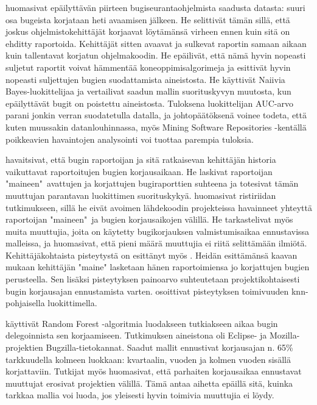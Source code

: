 \documentclass[utf8]{gradu3}
\begin{document}
\textcite{Lamkanfi-2012} huomasivat epäilyttävän piirteen bugiseurantaohjelmista
saadusta datasta: suuri osa bugeista korjataan heti avaamisen jälkeen. He
selittivät tämän sillä, että joskus ohjelmistokehittäjät korjaavat löytämänsä
virheen ennen kuin sitä on ehditty raportoida. Kehittäjät sitten avaavat ja
sulkevat raportin samaan aikaan kuin tallentavat korjatun ohjelmakoodin. He
epäilivät, että nämä hyvin nopeasti suljetut raportit voivat hämmentää
koneoppimisalgorimeja ja esittivät hyvin nopeasti suljettujen bugien
suodattamista aineistosta. %
He käyttivät Naiivia Bayes-luokittelijaa ja vertailivat saadun mallin
suorituskyvyn muutosta, kun epäilyttävät bugit on poistettu aineistosta.
Tuloksena luokittelijan AUC-arvo parani jonkin verran suodatetulla datalla, ja
johtopäätöksenä voinee todeta, että kuten muussakin datanlouhinnassa, myös
Mining Software Repositories -kentällä poikkeavien havaintojen analysointi voi
tuottaa parempia tuloksia.
 

\textcite{Guo-2010} havaitsivat, että bugin raportoijan ja sitä ratkaisevan
kehittäjän  historia vaikuttavat raportoitujen bugien korjausaikaan. He laskivat
raportoijan "maineen"\ avattujen ja korjattujen bugiraporttien suhteena ja
totesivat tämän muuttujan parantavan luokittimen suorituskykyä.%
\textcite{Bhattacharya-2011} huomasivat ristiriidan \parencite{Guo-2010}
tutkimukseen, sillä he eivät avoimen lähdekoodin projekteissa havainneet
yhteyttä raportoijan "maineen"\ ja bugien korjausaikojen välillä. He
tarkastelivat myös muita muuttujia, joita on käytetty bugikorjauksen
valmistumisaikaa ennustavissa malleissa, ja huomasivat, että pieni määrä
muuttujia ei riitä selittämään ilmiötä. \parencite{Bhattacharya-2011}
Kehittäjäkohtaista pisteytystä on esittänyt myös \textcite{ramarao-2016}. Heidän
esittämänsä kaavan mukaan kehittäjän "maine" lasketaan hänen raportoimiensa jo
korjattujen bugien perusteella. Sen lisäksi pisteytyksen painoarvo suhteutetaan
projektikohtaisesti bugin korjausajan ennustamista varten.
\textcite{ramarao-2016} osoittivat pisteytyksen toimivuuden knn-pohjaisella
luokittimella.

%
%

\textcite{Marks-2011} käyttivät Random Forest -algoritmia luodakseen tutkiakseen
aikaa bugin delegoinnista sen korjaamiseen. Tutkimuksen aineistona oli Eclipse-
ja Mozilla-projektien Bugzilla-tietokannat. Saadut mallit ennustivat korjausajan
n. 65\% tarkkuudella kolmeen luokkaan: kvartaalin, vuoden ja kolmen vuoden
sisällä korjattaviin. Tutkijat myös huomasivat, että parhaiten korjausaikaa
ennustavat muuttujat erosivat projektien välillä. Tämä antaa aihetta epäillä
sitä, kuinka tarkkaa mallia voi luoda, jos yleisesti hyvin toimivia muuttujia ei
löydy.
\end{document}
